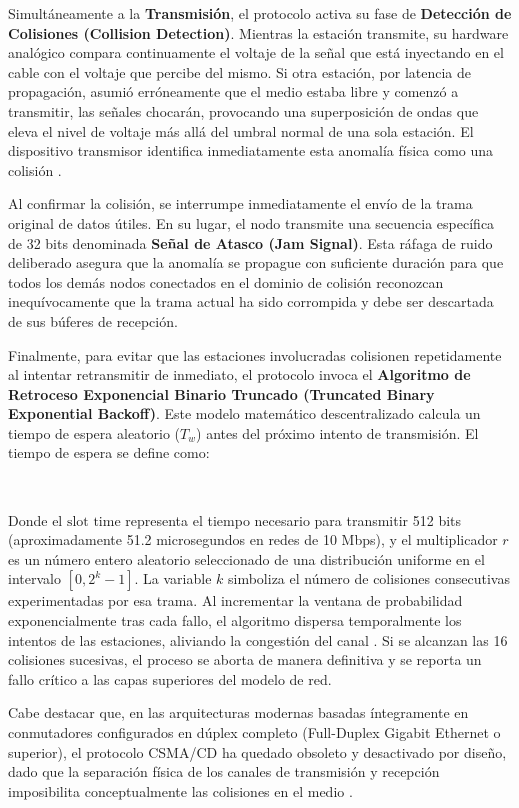 \documentclass[a4paper,12pt]{article}
\begin{document}
Simultáneamente a la \textbf{Transmisión}, el protocolo activa su fase de \textbf{Detección de Colisiones (Collision Detection)}. Mientras la estación transmite, su hardware analógico compara continuamente el voltaje de la señal que está inyectando en el cable con el voltaje que percibe del mismo. Si otra estación, por latencia de propagación, asumió erróneamente que el medio estaba libre y comenzó a transmitir, las señales chocarán, provocando una superposición de ondas que eleva el nivel de voltaje más allá del umbral normal de una sola estación. El dispositivo transmisor identifica inmediatamente esta anomalía física como una colisión \cite{stallings2014}.

Al confirmar la colisión, se interrumpe inmediatamente el envío de la trama original de datos útiles. En su lugar, el nodo transmite una secuencia específica de 32 bits denominada \textbf{Señal de Atasco (Jam Signal)}. Esta ráfaga de ruido deliberado asegura que la anomalía se propague con suficiente duración para que todos los demás nodos conectados en el dominio de colisión reconozcan inequívocamente que la trama actual ha sido corrompida y debe ser descartada de sus búferes de recepción.

Finalmente, para evitar que las estaciones involucradas colisionen repetidamente al intentar retransmitir de inmediato, el protocolo invoca el \textbf{Algoritmo de Retroceso Exponencial Binario Truncado (Truncated Binary Exponential Backoff)}. Este modelo matemático descentralizado calcula un tiempo de espera aleatorio ($T_w$) antes del próximo intento de transmisión. El tiempo de espera se define como:

\

Donde el $\text{slot time}$ representa el tiempo necesario para transmitir 512 bits (aproximadamente 51.2 microsegundos en redes de 10 Mbps), y el multiplicador $r$ es un número entero aleatorio seleccionado de una distribución uniforme en el intervalo $[0, 2^k - 1]$. La variable $k$ simboliza el número de colisiones consecutivas experimentadas por esa trama. Al incrementar la ventana de probabilidad exponencialmente tras cada fallo, el algoritmo dispersa temporalmente los intentos de las estaciones, aliviando la congestión del canal \cite{kurose2017}. Si se alcanzan las 16 colisiones sucesivas, el proceso se aborta de manera definitiva y se reporta un fallo crítico a las capas superiores del modelo de red.

Cabe destacar que, en las arquitecturas modernas basadas íntegramente en conmutadores configurados en dúplex completo (Full-Duplex Gigabit Ethernet o superior), el protocolo CSMA/CD ha quedado obsoleto y desactivado por diseño, dado que la separación física de los canales de transmisión y recepción imposibilita conceptualmente las colisiones en el medio \cite{ieee8023}.
\end{document}
